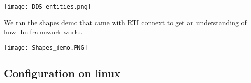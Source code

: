 \begin{center}
	\texttt{[image: DDS\_entities.png]}
\end{center}

We ran the shapes demo that came with RTI connext to get an understanding of how the framework works.

\begin{center}
	\texttt{[image: Shapes\_demo.PNG]}
\end{center}

\subsection{Configuration on linux}